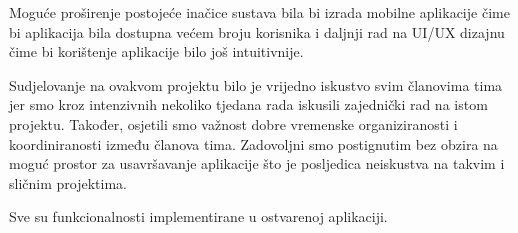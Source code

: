 		Moguće proširenje postojeće inačice sustava bila bi izrada mobilne aplikacije čime bi aplikacija bila dostupna većem broju korisnika i daljnji rad na UI/UX dizajnu čime bi korištenje aplikacije bilo još intuitivnije.
		
		Sudjelovanje na ovakvom projektu bilo je vrijedno iskustvo svim članovima tima jer smo kroz intenzivnih nekoliko tjedana rada iskusili zajednički rad na istom projektu. Također, osjetili smo važnost dobre vremenske organiziranosti i koordiniranosti između članova tima. Zadovoljni smo postignutim bez obzira na moguć prostor za usavršavanje aplikacije što je posljedica neiskustva na takvim i sličnim projektima.
		
		Sve su funkcionalnosti implementirane u ostvarenoj aplikaciji.

		
		\eject 
